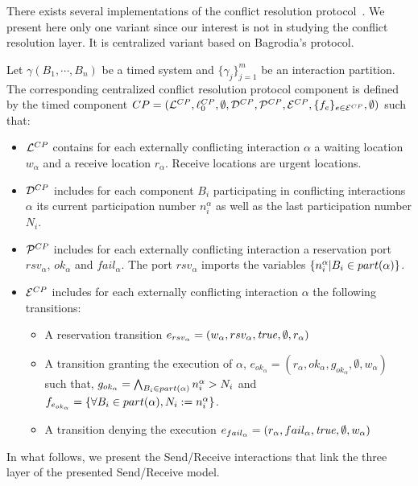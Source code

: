 There exists several implementations of the conflict resolution protocol~\cite{crp}. 
We present here only one variant since our interest is not in studying the 
conflict resolution layer. It is centralized variant based on Bagrodia's protocol.

\begin{definition}
  Let $\gamma(B_1,\cdots,B_n)$ be a timed system and $\{\gamma_j\}^m_{j=1}$ be an interaction
  partition. The corresponding centralized conflict resolution protocol component is defined
  by the timed component $CP=(\mathcal{L}^{CP},\ell_0^{CP},\emptyset,\mathcal{D}^{CP},\mathcal{P}^{CP},\mathcal{E}^{CP},
  \{f_e\}_{e\in\mathcal{E}^{CP}},\emptyset)$ such that:
  \begin{itemize}
    \item $\mathcal{L}^{CP}$ contains for each externally conflicting interaction $\alpha$ a waiting
      location $w_{\alpha}$ and a receive location $r_{\alpha}$. Receive locations are 
      urgent locations.
    \item $\mathcal{D}^{CP}$ includes for each component $B_i$ participating in conflicting 
      interactions $\alpha$ its current participation number $n_i^{\alpha}$ as well as the last 
      participation number $N_i$.
    \item $\mathcal{P}^{CP}$ includes for each externally conflicting interaction a reservation port
      $rsv_{\alpha}$, $ok_{\alpha}$ and $fail_{\alpha}$. The port $rsv_{\alpha}$ imports
      the variables $\{n_i^{\alpha}|B_i\in part(\alpha)\}$.
    \item $\mathcal{E}^{CP}$ includes for each externally conflicting interaction $\alpha$ the 
      following transitions:
      \begin{itemize}
        \item A reservation transition 
          $e_{rsv_{\alpha}}=(w_{\alpha},rsv_{\alpha},\textnormal{\textit{true}},\emptyset,r_{\alpha})$ 
        \item A transition granting the execution of $\alpha$, 
          $e_{ok_{\alpha}}=(r_{\alpha},ok_{\alpha},g_{ok_{\alpha}},\emptyset,w_{\alpha})$ 
          such that, $g_{ok_{\alpha}}=\bigwedge_{B_i\in part(\alpha)} n_i^{\alpha}>N_i$ and
          $f_{e_{ok_{\alpha}}}=\{\forall B_i\in part(\alpha), N_i:=n_i^{\alpha}\}$.
        \item A transition denying the execution 
          $e_{fail_{\alpha}}=(r_{\alpha},fail_{\alpha},\textnormal{\textit{true}},\emptyset,w_{\alpha})$
      \end{itemize}
  \end{itemize}
\end{definition}

In what follows, we present the Send/Receive interactions that link the three layer of the 
presented Send/Receive model.

